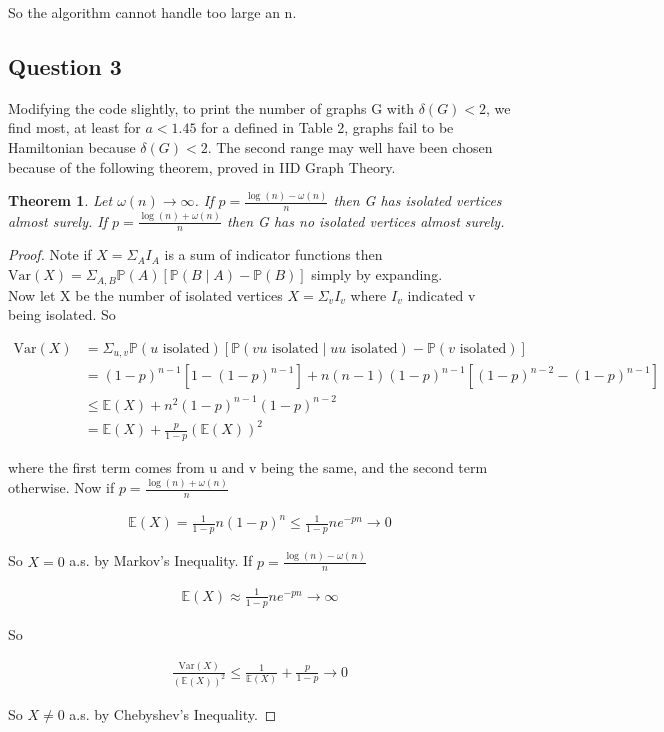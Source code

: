 \documentclass[10pt,a4paper]{report}
\newtheorem*{theorem}{Theorem}
\begin{document}
So the algorithm cannot handle too large an n.

\subsection*{Question 3}
Modifying the code slightly, to print the number of graphs G with $\delta(G) < 2$, we find most, at least for $a<1.45$ for a defined in Table 2, graphs fail to be Hamiltonian because  $\delta(G) < 2$. The second range may well have been chosen because of the following theorem, proved in IID Graph Theory.

\begin{theorem}
Let $\omega(n) \rightarrow \infty$.  If $p =\frac{\log(n)-\omega(n)}{n}$ then G has isolated vertices almost surely.  If $p =\frac{\log(n)+\omega(n)}{n}$ then G has no isolated vertices almost surely.
\end{theorem}

\begin{proof}
Note if $X=\Sigma_A I_A$ is a sum of indicator functions then $\text{Var}(X)=\Sigma_{A,B}\mathbb{P}(A)[ \mathbb{P}(B \mid A) -\mathbb{P}(B)]$ simply by expanding.\\

Now let X be the number of isolated vertices $X=\Sigma_v I_v$ where $I_v$ indicated v being isolated. So 

\begin{align*}
\text{Var}(X)&=\Sigma_{u,v} \mathbb{P}(u \text{ isolated})[ \mathbb{P}(v u \text{ isolated} \mid u u \text{ isolated}) -\mathbb{P}(v \text{ isolated})]\\
&=(1-p)^{n-1}[1-(1-p)^{n-1}] + n(n-1)(1-p)^{n-1}[(1-p)^{n-2}-(1-p)^{n-1}]\\
&\leq \mathbb{E}(X)+n^2(1-p)^{n-1}(1-p)^{n-2}\\
&= \mathbb{E}(X) + \frac{p}{1-p}(\mathbb{E}(X))^2
\end{align*}

where the first term comes from u and v being the same, and the second term otherwise. Now if $p =\frac{\log(n)+\omega(n)}{n}$ 

\begin{align*}
\mathbb{E}(X) = \frac{1}{1-p}n(1-p)^n \leq \frac{1}{1-p}ne^{-pn} \rightarrow 0
\end{align*}

So $X=0$ a.s. by Markov's Inequality. If $p =\frac{\log(n)-\omega(n)}{n}$ 

\begin{align*}
\mathbb{E}(X) \approx \frac{1}{1-p}ne^{-pn} \rightarrow \infty
\end{align*}

So 

\begin{align*}
\frac{\text{Var}(X)}{(\mathbb{E}(X))^2} \leq \frac{1}{\mathbb{E}(X)} + \frac{p}{1-p} \rightarrow 0
\end{align*}

So $X\neq0$ a.s. by Chebyshev's Inequality.

\end{proof}
\end{document}
